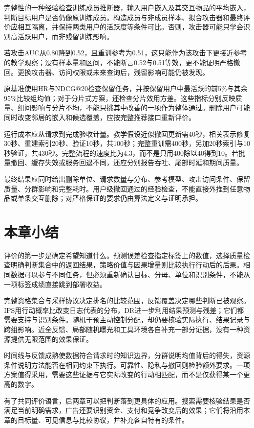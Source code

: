 完整性的一种经验检查训练成员推断器，输入用户嵌入及其交互物品的平均嵌入，判断目标用户是否仍像原训练成员。构造成员与非成员样本、拟合攻击器和最终评价应相互隔离，并保持两类用户的活跃度等条件可比。否则，攻击器可能只学会识别高活跃用户，而非残留训练影响。

若攻击AUC从0.80降到0.52，且重训参考为0.51，这只能作为该攻击下更接近参考的教学观察；没有样本量和区间，不能断言0.52与0.51等效，更不能证明严格撤回。更换攻击器、访问权限或未来查询后，残留影响可能仍被发现。

原基准使用HR与NDCG@20检查保留任务，并按保留用户中最活跃的前5\%与其余95\%比较组均值；对于分片式方案，还检查分片效用方差。这些指标分别反映质量、组间影响与分片不均，不能只挑其中改善的一项作为整体通过。删除用户可能同时改变邻居的嵌入和候选覆盖，应按完整推荐接口重新评价。

运行成本应从请求到完成验收计量。教学假设近似撤回更新需40秒，相关表示修复30秒、重建索引20秒、验证10秒，共100秒；完整重训需400秒，另加20秒索引与10秒验证，共430秒。完整流程的速度比为4.3，而不是只用400除以40得到10。若批量撤回、缓存失效或服务回退不同，还应分别报告吞吐、尾部时延和期间质量。

最终结果应同时给出删除单位、请求数量与分布、参考模型、攻击访问条件、保留质量、分群影响和完整耗时。用户级撤回通过的经验检查，不能直接外推到任意物品或单条交互删除；对严格保证的要求仍由算法定义与证明承担。

\section{本章小结}
\label{sec:rs-evaluation-summary}

评价的第一步是确定希望知道什么。预测误差检查指定标签上的数值，选择质量检查明确判断集合中的返回结果，策略价值与因果增量则比较执行行动后的后果。相同数据可以参与不同任务，但必须重新确认目标、分母、单位和识别条件，不能从一项标签成绩直接跳到部署收益。

完整资格集合与采样协议决定排名的比较范围，反馈覆盖决定哪些判断已被观察。IPS用行动概率比改变日志代表的分布，DR进一步利用结果预测与残差；它们都需要支持与识别条件。随机干预主动控制分配，却仍要核验实际执行、结果记录与跨组影响。近全反馈、局部随机曝光和工具环境各自补充一部分证据，没有一种资源提供无限范围的效果保证。

时间线与反馈成熟使数据符合请求时的知识边界，分群说明均值背后的得失，资源条件说明方法能否在相同约束下执行。可靠性、隐私与撤回则检验额外要求。一项方案值得采用，需要这些证据与它实际改变的行动相匹配，而不是仅获得某一个更高的数字。

有了共同评价语言，后两章可以把判断落到更具体的应用。搜索需要核验结果是否满足当前明确需求，广告还要识别资金、支付和竞争改变后的效果；它们将沿用本章的目标量、可见信息与比较协议，并补充各自特有的条件。
